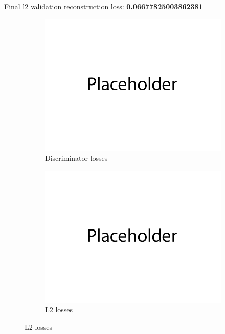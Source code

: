 \documentclass{article}
\begin{document}
Final l2 validation reconstruction loss: \textbf{0.06677825003862381} \\
\begin{figure}[H]
    \centering
    \begin{subfigure}{0.45\textwidth}
        \centering
        \includegraphics[width=\textwidth]{figures/q3b_gan_losses.png}
        \caption{Discriminator losses}
    \end{subfigure}
    \begin{subfigure}{0.45\textwidth}
        \centering
        \includegraphics[width=\textwidth]{figures/q3b_l2_losses.png}
        \caption{L2 losses}

\end{subfigure}
\end{figure}
\end{document}
